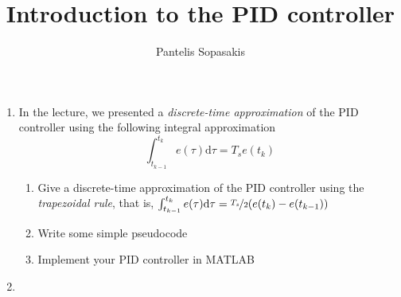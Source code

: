 \documentclass[a4paper,10pt,reqno]{amsart}
\title[PID Controller]{Introduction to the PID controller}
\author[P. Sopasakis]{Pantelis Sopasakis}
\numberwithin{equation}{section}
\theoremstyle{plain}
\begin{document}
\maketitle

\begin{enumerate} 
 \item In the lecture, we presented a \textit{discrete-time approximation} of the 
       PID controller using the following integral approximation
       \[
        \int_{t_{k-1}}^{t_k} e(\tau)\mathrm{d}\tau = T_s e(t_k)
       \]
      \begin{enumerate}
	\item Give a discrete-time approximation of the PID controller using the 
	      \textit{trapezoidal rule}, that is, 
	      \(\int_{t_{k-1}}^{t_k} e(\tau)\mathrm{d}\tau = \nicefrac{T_s}{2} (e(t_k) - e(t_{k-1}))\)
	\item Write some simple pseudocode
	\item Implement your PID controller in MATLAB
      \end{enumerate}

 \item      
\end{enumerate}
\end{document}
